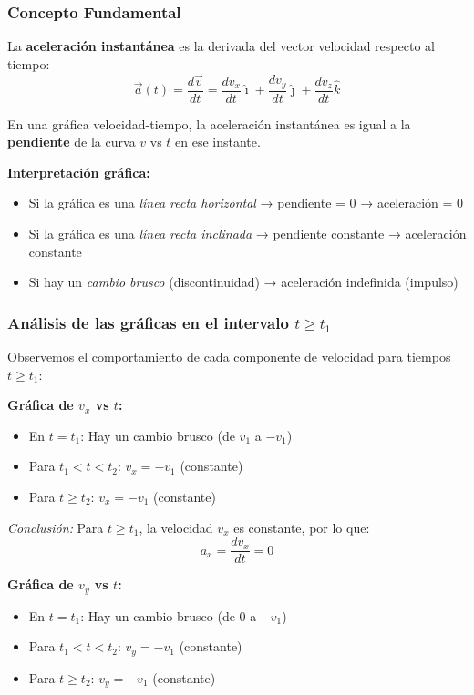 \documentclass[12pt, a4paper]{article}
\begin{document}
\subsubsection*{Concepto Fundamental}
La \textbf{aceleración instantánea} es la derivada del vector velocidad respecto al tiempo:
\begin{equation}
\vec{a}(t) = \frac{d\vec{v}}{dt} = \frac{dv_x}{dt}\hat{\imath} + \frac{dv_y}{dt}\hat{\jmath} + \frac{dv_z}{dt}\hat{k}
\end{equation}

En una gráfica velocidad-tiempo, la aceleración instantánea es igual a la \textbf{pendiente} de la curva $v$ vs $t$ en ese instante.

\textbf{Interpretación gráfica:}
\begin{itemize}
    \item Si la gráfica es una \textit{línea recta horizontal} → pendiente = 0 → aceleración = 0
    \item Si la gráfica es una \textit{línea recta inclinada} → pendiente constante → aceleración constante
    \item Si hay un \textit{cambio brusco} (discontinuidad) → aceleración indefinida (impulso)
\end{itemize}

\subsubsection*{Análisis de las gráficas en el intervalo $t \geq t_1$}

Observemos el comportamiento de cada componente de velocidad para tiempos $t \geq t_1$:

\textbf{Gráfica de $v_x$ vs $t$:}
\begin{itemize}
    \item En $t = t_1$: Hay un cambio brusco (de $v_1$ a $-v_1$)
    \item Para $t_1 < t < t_2$: $v_x = -v_1$ (constante)
    \item Para $t \geq t_2$: $v_x = -v_1$ (constante)
\end{itemize}

\textit{Conclusión:} Para $t \geq t_1$, la velocidad $v_x$ es constante, por lo que:
\begin{equation}
a_x = \frac{dv_x}{dt} = 0
\end{equation}

\textbf{Gráfica de $v_y$ vs $t$:}
\begin{itemize}
    \item En $t = t_1$: Hay un cambio brusco (de $0$ a $-v_1$)
    \item Para $t_1 < t < t_2$: $v_y = -v_1$ (constante)
    \item Para $t \geq t_2$: $v_y = -v_1$ (constante)
\end{itemize}
\end{document}
